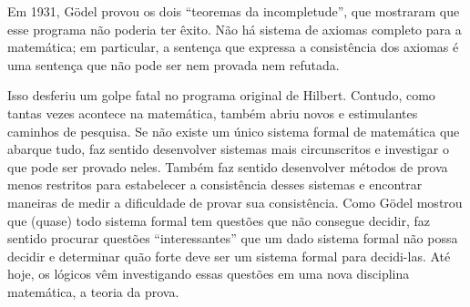 \documentclass[../../../include/open-logic-section]{subfiles}
\begin{document}
Em 1931, G\"odel provou os dois ``teoremas da incompletude'', que
mostraram que esse programa não poderia ter êxito. Não há sistema de
axiomas completo para a matemática; em particular, a sentença que
expressa a consistência dos axiomas é uma sentença que não pode ser nem
provada nem refutada.

Isso desferiu um golpe fatal no programa original de Hilbert. Contudo,
como tantas vezes acontece na matemática, também abriu novos e
estimulantes caminhos de pesquisa. Se não existe um único sistema
formal de matemática que abarque tudo, faz sentido desenvolver sistemas
mais circunscritos e investigar o que pode ser provado neles. Também
faz sentido desenvolver métodos de prova menos restritos para
estabelecer a consistência desses sistemas e encontrar maneiras de
medir a dificuldade de provar sua consistência. Como G\"odel mostrou
que (quase) todo sistema formal tem questões que não consegue decidir,
faz sentido procurar questões ``interessantes'' que um dado sistema
formal não possa decidir e determinar quão forte deve ser um sistema
formal para decidi-las. Até hoje, os lógicos vêm investigando essas
questões em uma nova disciplina matemática, a teoria da prova.
\end{document}
